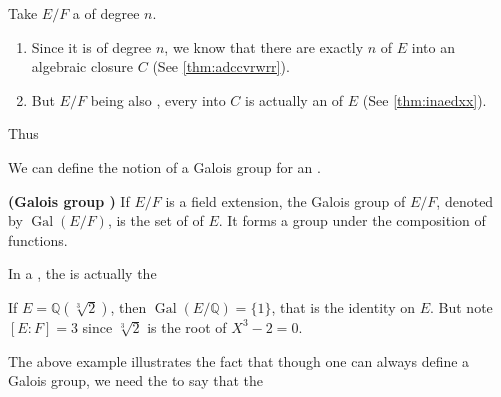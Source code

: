 \documentclass{article}
\newcommand{\bfs}[1]{\textbf{({#1}) }}
\begin{document}
\begin{lema}Take $E / F$ a  of degree $n$.
\begin{enumerate}
    \item  Since it is  of degree $n$, we know that there are exactly $n $  of $E$ into an algebraic closure $C$ (See \cref{thm:adccvrwrr}). 
    \item But $E / F$ being also , every  into $C$ is actually an
 of $E$ (See \cref{thm:inaedxx}). 
\end{enumerate}
Thus 
\end{lema}


We can define the notion of a Galois group for an .
\begin{defa}\bfs{Galois group }
   If $E / F$ is a field extension, the Galois group of $E / F$, denoted by $\operatorname{Gal}(E / F)$, is the set of  of $E$. It forms a group under the composition of functions.
\end{defa}
\begin{cora}
In a , the  is actually the 
\end{cora}

\begin{exma}
If $E=\mathbb{Q}(\sqrt[3]{2})$, then $\operatorname{Gal}(E / \mathbb{Q})=\{1\}$, that is the identity on $E$. But note $[E:F]=3$ since $\sqrt[3]{2}$ is the root of $X^3-2=0$.
\end{exma}

\begin{rema}
The above example illustrates the fact that though one can always define a Galois group, we need the  to say that the 
\end{rema}
\end{document}
